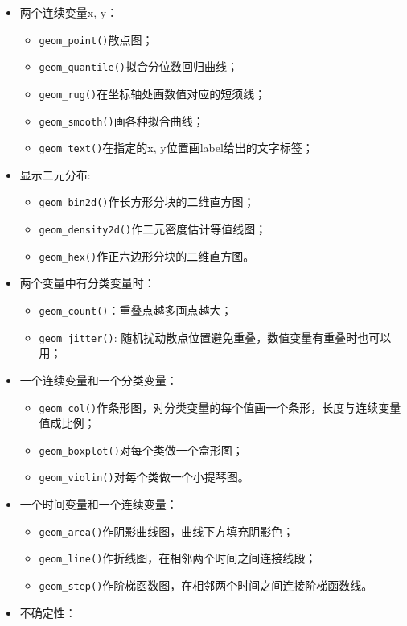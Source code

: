 \documentclass[
]{book}
\providecommand{\tightlist}{%
  \setlength{\itemsep}{0pt}\setlength{\parskip}{0pt}}
\begin{document}
\begin{itemize}
  \begin{itemize}
  \item
    两个连续变量x, y：

    \begin{itemize}
    \tightlist
    \item
      \texttt{geom\_point()}散点图；
    \item
      \texttt{geom\_quantile()}拟合分位数回归曲线；
    \item
      \texttt{geom\_rug()}在坐标轴处画数值对应的短须线；
    \item
      \texttt{geom\_smooth()}画各种拟合曲线；
    \item
      \texttt{geom\_text()}在指定的x, y位置画label给出的文字标签；
    \end{itemize}
  \item
    显示二元分布:

    \begin{itemize}
    \tightlist
    \item
      \texttt{geom\_bin2d()}作长方形分块的二维直方图；
    \item
      \texttt{geom\_density2d()}作二元密度估计等值线图；
    \item
      \texttt{geom\_hex()}作正六边形分块的二维直方图。
    \end{itemize}
  \item
    两个变量中有分类变量时：

    \begin{itemize}
    \tightlist
    \item
      \texttt{geom\_count()}：重叠点越多画点越大；
    \item
      \texttt{geom\_jitter()}:
      随机扰动散点位置避免重叠，数值变量有重叠时也可以用；
    \end{itemize}
  \item
    一个连续变量和一个分类变量：

    \begin{itemize}
    \tightlist
    \item
      \texttt{geom\_col()}作条形图，对分类变量的每个值画一个条形，长度与连续变量值成比例；
    \item
      \texttt{geom\_boxplot()}对每个类做一个盒形图；
    \item
      \texttt{geom\_violin()}对每个类做一个小提琴图。
    \end{itemize}
  \item
    一个时间变量和一个连续变量：

    \begin{itemize}
    \tightlist
    \item
      \texttt{geom\_area()}作阴影曲线图，曲线下方填充阴影色；
    \item
      \texttt{geom\_line()}作折线图，在相邻两个时间之间连接线段；
    \item
      \texttt{geom\_step()}作阶梯函数图，在相邻两个时间之间连接阶梯函数线。
    \end{itemize}
  \item
    不确定性：


\end{itemize}
\end{itemize}
\end{document}
